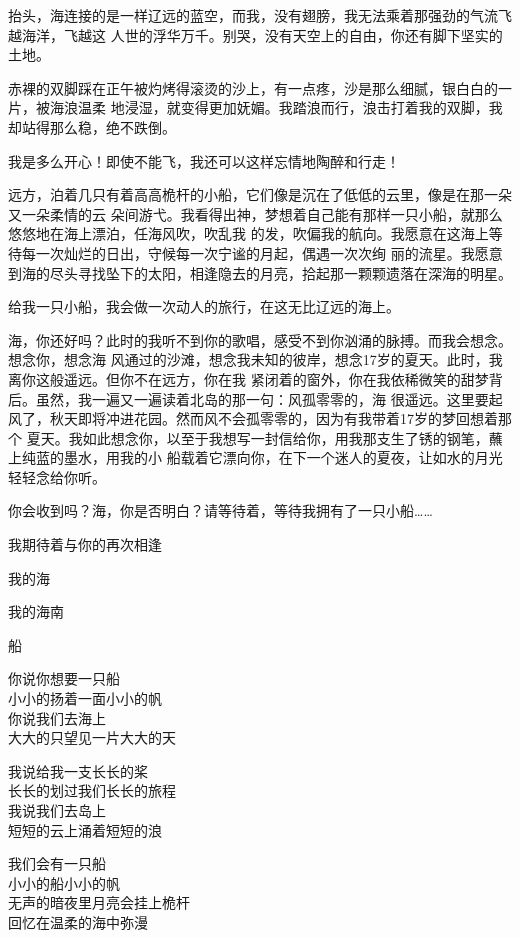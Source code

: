 \documentclass[12pt,a4paper]{article}
\def\blankrev{\vspace{1ex}}									%
\begin{document}
		抬头，海连接的是一样辽远的蓝空，而我，没有翅膀，我无法乘着那强劲的气流飞越海洋，飞越这
	人世的浮华万千。别哭，没有天空上的自由，你还有脚下坚实的土地。

		赤裸的双脚踩在正午被灼烤得滚烫的沙上，有一点疼，沙是那么细腻，银白白的一片，被海浪温柔
	地浸湿，就变得更加妩媚。我踏浪而行，浪击打着我的双脚，我却站得那么稳，绝不跌倒。

		我是多么开心！即使不能飞，我还可以这样忘情地陶醉和行走！

		远方，泊着几只有着高高桅杆的小船，它们像是沉在了低低的云里，像是在那一朵又一朵柔情的云
	朵间游弋。我看得出神，梦想着自己能有那样一只小船，就那么悠悠地在海上漂泊，任海风吹，吹乱我
	的发，吹偏我的航向。我愿意在这海上等待每一次灿烂的日出，守候每一次宁谧的月起，偶遇一次次绚
	丽的流星。我愿意到海的尽头寻找坠下的太阳，相逢隐去的月亮，拾起那一颗颗遗落在深海的明星。

		给我一只小船，我会做一次动人的旅行，在这无比辽远的海上。

		海，你还好吗？此时的我听不到你的歌唱，感受不到你汹涌的脉搏。而我会想念。想念你，想念海
	风通过的沙滩，想念我未知的彼岸，想念17岁的夏天。此时，我离你这般遥远。但你不在远方，你在我
	紧闭着的窗外，你在我依稀微笑的甜梦背后。虽然，我一遍又一遍读着北岛的那一句：风孤零零的，海
	很遥远。这里要起风了，秋天即将冲进花园。然而风不会孤零零的，因为有我带着17岁的梦回想着那个
	夏天。我如此想念你，以至于我想写一封信给你，用我那支生了锈的钢笔，蘸上纯蓝的墨水，用我的小
	船载着它漂向你，在下一个迷人的夏夜，让如水的月光轻轻念给你听。

		你会收到吗？海，你是否明白？请等待着，等待我拥有了一只小船……

		我期待着与你的再次相逢 \par
		我的海 \par
		我的海南

		\blankrev
		船

		\longpoem{}{}{}
		你说你想要一只船 \\
		小小的扬着一面小小的帆 \\
		你说我们去海上 \\
		大大的只望见一片大大的天

		我说给我一支长长的桨 \\
		长长的划过我们长长的旅程 \\
		我说我们去岛上 \\
		短短的云上涌着短短的浪

		我们会有一只船 \\
		小小的船小小的帆 \\
		无声的暗夜里月亮会挂上桅杆 \\
		回忆在温柔的海中弥漫
\end{document}
